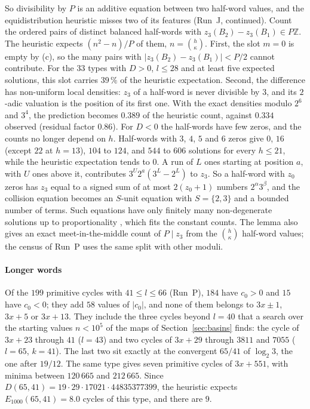 \documentclass[12pt]{amsart}
\theoremstyle{definition}
\theoremstyle{remark}
\newcommand{\Z}{\mathbb{Z}}
\begin{document}
So divisibility by $P$ is an additive equation between two half-word values, and the equidistribution heuristic misses two of its features (Run~J, continued). Count the ordered pairs of distinct balanced half-words with $z_3(B_2)-z_3(B_1)\in P\Z$. The heuristic expects $(n^2-n)/P$ of them, $n=\binom h\kappa$. First, the slot $m=0$ is empty by (c), so the many pairs with $|z_3(B_2)-z_3(B_1)|<P/2$ cannot contribute. For the $33$ types with $D>0$, $l\le28$ and at least five expected solutions, this slot carries $39\,\%$ of the heuristic expectation. Second, the difference has non-uniform local densities: $z_3$ of a half-word is never divisible by $3$, and its $2$-adic valuation is the position of its first one. With the exact densities modulo $2^6$ and $3^4$, the prediction becomes $0.389$ of the heuristic count, against $0.334$ observed (residual factor $0.86$). For $D<0$ the half-words have few zeros, and the counts no longer depend on $h$. Half-words with $3$, $4$, $5$ and $6$ zeros give $0$, $16$ (except $22$ at $h=13$), $104$ to $124$, and $544$ to $606$ solutions for every $h\le21$, while the heuristic expectation tends to $0$. A run of $L$ ones starting at position $a$, with $U$ ones above it, contributes $3^U2^a(3^L-2^L)$ to $z_3$. So a half-word with $z_0$ zeros has $z_3$ equal to a signed sum of at most $2(z_0+1)$ numbers $2^\alpha3^\beta$, and the collision equation becomes an $S$-unit equation with $S=\{2,3\}$ and a bounded number of terms. Such equations have only finitely many non-degenerate solutions up to proportionality \cite{Evertse_1984}, which fits the constant counts. The lemma also gives an exact meet-in-the-middle count of $P\mid z_3$ from the $\binom h\kappa$ half-word values; the census of Run~P uses the same split with other moduli.


\paragraph{Longer words} Of the $199$ primitive cycles with $41\le l\le66$ (Run~P), $184$ have $c_0>0$ and $15$ have $c_0<0$; they add $58$ values of $|c_0|$, and none of them belongs to $3x\pm1$, $3x+5$ or $3x+13$. They include the three cycles beyond $l=40$ that a search over the starting values $n<10^5$ of the maps of Section~\ref{sec:basins} finds: the cycle of $3x+23$ through $41$ ($l=43$) and two cycles of $3x+29$ through $3811$ and $7055$ ($l=65$, $k=41$). The last two sit exactly at the convergent $65/41$ of $\log_2 3$, the one after $19/12$. The same type gives seven primitive cycles of $3x+551$, with minima between $120\,665$ and $212\,665$. Since $D(65,41)=19\cdot29\cdot17021\cdot44835377399$, the heuristic expects $E_{1000}(65,41)=8.0$ cycles of this type, and there are $9$.
\end{document}
